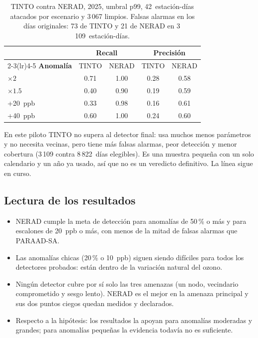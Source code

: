 \documentclass[11pt, letterpaper]{article}
\begin{document}
\begin{table}[H]
  \centering
  \small
  \caption{TINTO contra NERAD, 2025, umbral p99, 42~estación-días atacados por escenario y
    3\,067 limpios. Falsas alarmas en los días originales: 73 de TINTO y 21 de NERAD en
    3\,109~estación-días.}
  \label{tab:tinto}
  \begin{tabular}{@{}l cc cc@{}}
    \toprule
    & \multicolumn{2}{c}{\textbf{Recall}} & \multicolumn{2}{c}{\textbf{Precisión}} \\
    \cmidrule(lr){2-3}\cmidrule(lr){4-5}
    \textbf{Anomalía} & TINTO & NERAD & TINTO & NERAD \\
    \midrule
    $\times 2$   & 0.71 & 1.00 & 0.28 & 0.58 \\
    $\times 1.5$ & 0.40 & 0.90 & 0.19 & 0.59 \\
    +20~ppb      & 0.33 & 0.98 & 0.16 & 0.61 \\
    +40~ppb      & 0.60 & 1.00 & 0.24 & 0.60 \\
    \bottomrule
  \end{tabular}
\end{table}

En este piloto TINTO no supera al detector final: usa muchos menos parámetros y no
necesita vecinas, pero tiene más falsas alarmas, peor detección y menor cobertura (3\,109
contra 8\,822~días elegibles). Es una muestra pequeña con un solo calendario y un año ya
usado, así que no es un veredicto definitivo. La línea sigue en curso.

\subsection{Lectura de los resultados}

\begin{itemize}
  \item NERAD cumple la meta de detección para anomalías de 50\,\% o más y para escalones
    de 20~ppb o más, con menos de la mitad de falsas alarmas que PARAAD-SA.
  \item Las anomalías chicas (20\,\% o 10~ppb) siguen siendo difíciles para todos los
    detectores probados: están dentro de la variación natural del ozono.
  \item Ningún detector cubre por sí solo las tres amenazas (un nodo, vecindario
    comprometido y sesgo lento). NERAD es el mejor en la amenaza principal y sus dos
    puntos ciegos quedan medidos y declarados.
  \item Respecto a la hipótesis: los resultados la apoyan para anomalías moderadas y
    grandes; para anomalías pequeñas la evidencia todavía no es suficiente.
\end{itemize}
\end{document}
